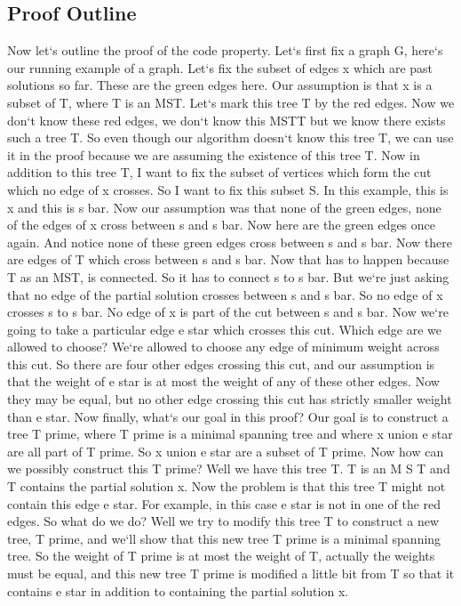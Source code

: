 \subsection{Proof Outline}
Now let`s outline the proof of the code property.
Let`s first fix a graph G, here`s our running example of a graph.
Let`s fix the subset of edges x which are past solutions so far.
These are the green edges here.
Our assumption is that x is a subset of T, where T is an MST\@.
Let`s mark this tree T by the red edges.
Now we don`t know these red edges, we don`t know this MSTT but we know there exists such a tree T\@.
So even though our algorithm doesn`t know this tree T, we can use it in the proof because we are assuming the existence of this tree T\@.
Now in addition to this tree T, I want to fix the subset of vertices which form the cut which no edge of x crosses.
So I want to fix this subset S\@.
In this example, this is x and this is s bar.
Now our assumption was that none of the green edges, none of the edges of x cross between s and s bar.
Now here are the green edges once again.
And notice none of these green edges cross between s and s bar.
Now there are edges of T which cross between s and s bar.
Now that has to happen because T as an MST, is connected.
So it has to connect s to s bar.
But we`re just asking that no edge of the partial solution crosses between s and s bar.
So no edge of x crosses s to s bar.
No edge of x is part of the cut between s and s bar.
Now we`re going to take a particular edge e star which crosses this cut.
Which edge are we allowed to choose? We`re allowed to choose any edge of minimum weight across this cut.
So there are four other edges crossing this cut, and our assumption is that the weight of e star is at most the weight of any of these other edges.
Now they may be equal, but no other edge crossing this cut has strictly smaller weight than e star.
Now finally, what`s our goal in this proof? Our goal is to construct a tree T prime, where T prime is a minimal spanning tree and where x union e star are all part of T prime.
So x union e star are a subset of T prime.
Now how can we possibly construct this T prime? Well we have this tree T\@.
T is an M S T and T contains the partial solution x.
Now the problem is that this tree T might not contain this edge e star.
For example, in this case e star is not in one of the red edges.
So what do we do? Well we try to modify this tree T to construct a new tree, T prime, and we`ll show that this new tree T prime is a minimal spanning tree.
So the weight of T prime is at most the weight of T, actually the weights must be equal, and this new tree T prime is modified a little bit from T so that it contains e star in addition to containing the partial solution x.

